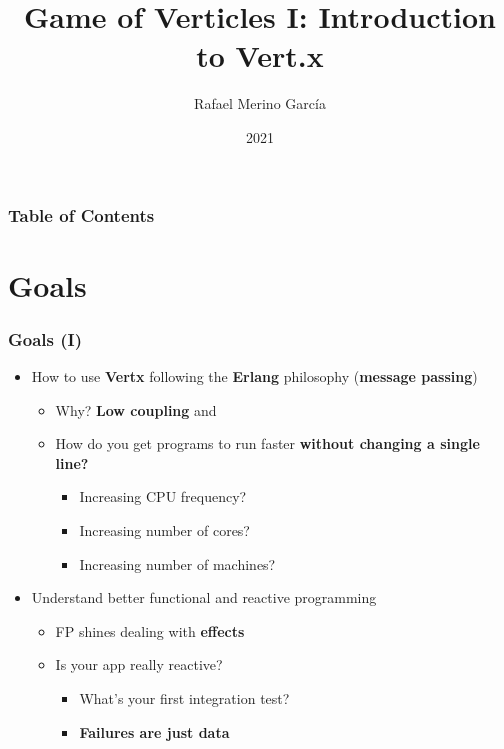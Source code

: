 \documentclass{beamer}
\title{Game of Verticles I: Introduction to Vert.x}
\author{Rafael Merino García}
\institute{@imrafaelmerino}
\date{2021}
\begin{document}
\frame{\titlepage}

\begin{frame}
\frametitle{Table of Contents}
\tableofcontents
\end{frame}

\section{Goals}

\begin{frame}
\frametitle{Goals (I)}
\begin{itemize}
    \item<1-> How to use  \textbf{Vertx} following the \textbf{Erlang} philosophy (\textbf{message passing})
    \begin{itemize}
        \item<2-> Why? \textbf{Low coupling} and  
        \item<3-> How do you get programs to run faster  \textbf{without changing a single line?}
            \begin{itemize}
               \item<4-> Increasing CPU frequency?      
               \item<5-> Increasing number of cores?
               \item<6-> Increasing number of machines?
            \end{itemize}    
     \end{itemize}    
    \item<7-> Understand better functional and reactive programming
    \begin{itemize}
        \item<8-> FP shines dealing with \textbf{effects}       
        \item<9-> Is your app really reactive? 
            \begin{itemize}
                 \item<10-> What's your first integration test?      
                 \item<11-> \textbf{Failures are just data}
           \end{itemize}   
    \end{itemize}    
\end{itemize}    
\end{frame} 
\end{document}
